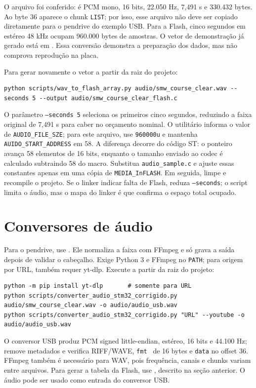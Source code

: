 \documentclass[12pt,journal,compsoc]{IEEEtran}
\begin{document}
O arquivo  foi conferido: é PCM mono, 16 bits, 22.050 Hz, 7,491 s e 330.432 bytes. Ao byte 36 aparece o chunk \texttt{LIST}; por isso, esse arquivo não deve ser copiado diretamente para o pendrive do exemplo USB. Para a Flash, cinco segundos em estéreo 48 kHz ocupam 960.000 bytes de amostras. O vetor de demonstração já gerado está em . Essa conversão demonstra a preparação dos dados, mas não comprova reprodução na placa.

Para gerar novamente o vetor a partir da raiz do projeto:
\begin{lstlisting}
python scripts/wav_to_flash_array.py audio/smw_course_clear.wav --seconds 5 --output audio/smw_course_clear_flash.c
\end{lstlisting}
O parâmetro \texttt{--seconds 5} seleciona os primeiros cinco segundos, reduzindo a faixa original de 7,491 s para caber no orçamento nominal. O utilitário informa o valor de \texttt{AUDIO\_FILE\_SZE}; para este arquivo, use \texttt{960000u} e mantenha \texttt{AUIDO\_START\_ADDRESS} em 58. A diferença decorre do código ST: o ponteiro avança 58 elementos de 16 bits, enquanto o tamanho enviado ao codec é calculado subtraindo 58 do macro. Substitua \texttt{audio\_sample.c} e ajuste essas constantes apenas em uma cópia de \texttt{MEDIA\_InFLASH}. Em seguida, limpe e recompile o projeto. Se o linker indicar falta de Flash, reduza \texttt{--seconds}; o script limita o áudio, mas o mapa do linker é que confirma o espaço total ocupado.

\section{Conversores de áudio}
Para o pendrive, use . Ele normaliza a faixa com FFmpeg e só grava a saída depois de validar o cabeçalho. Exige Python 3 e FFmpeg no \texttt{PATH}; para origem por URL, também requer yt-dlp. Execute a partir da raiz do projeto:
\begin{lstlisting}
python -m pip install yt-dlp       # somente para URL
python scripts/converter_audio_stm32_corrigido.py audio/smw_course_clear.wav -o audio/audio_usb.wav
python scripts/converter_audio_stm32_corrigido.py "URL" --youtube -o audio/audio_usb.wav
\end{lstlisting}
O conversor USB produz PCM signed little-endian, estéreo, 16 bits e 44.100 Hz; remove metadados e verifica RIFF/WAVE, \texttt{fmt } de 16 bytes e \texttt{data} no offset 36. FFmpeg também é necessário para WAV, pois frequência, canais e chunks variam entre arquivos. Para gerar a tabela da Flash, use , descrito na seção anterior. O áudio  pode ser usado como entrada do conversor USB.
\end{document}
